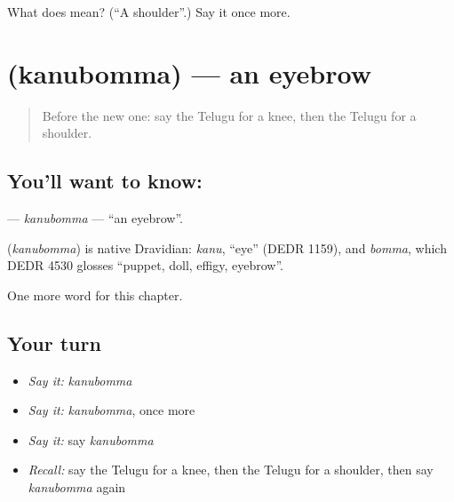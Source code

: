 \begin{tcolorbox}[breakable,colback=teal!4,colframe=teal!35!black,title={Before you move on}]
What does  mean? (\textquotedblleft{}A shoulder\textquotedblright{}.) Say it once more.
\end{tcolorbox}
\section[\texorpdfstring{\te{కనుబొమ్మ} (kanubomma)}{కనుబొమ్మ (kanubomma)}]{ (kanubomma) — an eyebrow}

\label{lesson:TE-C127-kanubomma}



\begin{quote}
Before the new one: say the Telugu for a knee, then the Telugu for a shoulder.
\end{quote}

\subsection*{You'll want to know: }
\textbf{} — \emph{kanubomma} — \textquotedblleft{}an eyebrow\textquotedblright{}.

\begin{cousinweb}
\textbf{} (\emph{kanubomma}) is native Dravidian: \emph{kanu}, \textquotedblleft{}eye\textquotedblright{} (DEDR 1159), and \emph{bomma}, which DEDR 4530 glosses \textquotedblleft{}puppet, doll, effigy, eyebrow\textquotedblright{}.
\end{cousinweb}

\begin{grammarlens}[title={What you've built}]
One more word for this chapter.
\end{grammarlens}

\subsection*{Your turn}
\begin{itemize}
\raggedright
  \item \emph{Say it:} \emph{kanubomma}
  \item \emph{Say it:} \emph{kanubomma}, once more
  \item \emph{Say it:} say \emph{kanubomma}
  \item \emph{Recall:} say the Telugu for a knee, then the Telugu for a shoulder, then say \emph{kanubomma} again
\end{itemize}

